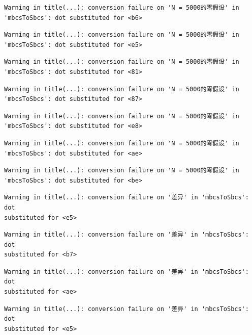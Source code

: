 \documentclass[
  letterpaper,
  DIV=11,
  numbers=noendperiod]{scrreprt}
\begin{document}
\begin{verbatim}
Warning in title(...): conversion failure on 'N = 5000的零假设' in
'mbcsToSbcs': dot substituted for <b6>
\end{verbatim}

\begin{verbatim}
Warning in title(...): conversion failure on 'N = 5000的零假设' in
'mbcsToSbcs': dot substituted for <e5>
\end{verbatim}

\begin{verbatim}
Warning in title(...): conversion failure on 'N = 5000的零假设' in
'mbcsToSbcs': dot substituted for <81>
\end{verbatim}

\begin{verbatim}
Warning in title(...): conversion failure on 'N = 5000的零假设' in
'mbcsToSbcs': dot substituted for <87>
\end{verbatim}

\begin{verbatim}
Warning in title(...): conversion failure on 'N = 5000的零假设' in
'mbcsToSbcs': dot substituted for <e8>
\end{verbatim}

\begin{verbatim}
Warning in title(...): conversion failure on 'N = 5000的零假设' in
'mbcsToSbcs': dot substituted for <ae>
\end{verbatim}

\begin{verbatim}
Warning in title(...): conversion failure on 'N = 5000的零假设' in
'mbcsToSbcs': dot substituted for <be>
\end{verbatim}

\begin{verbatim}
Warning in title(...): conversion failure on '差异' in 'mbcsToSbcs': dot
substituted for <e5>
\end{verbatim}

\begin{verbatim}
Warning in title(...): conversion failure on '差异' in 'mbcsToSbcs': dot
substituted for <b7>
\end{verbatim}

\begin{verbatim}
Warning in title(...): conversion failure on '差异' in 'mbcsToSbcs': dot
substituted for <ae>
\end{verbatim}

\begin{verbatim}
Warning in title(...): conversion failure on '差异' in 'mbcsToSbcs': dot
substituted for <e5>
\end{verbatim}
\end{document}
